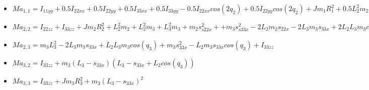\begin{itemize}
	\item 
	$Ma_{1,1}= I_{11yy}+0.5I_{22xx}+0.5I_{22yy}+0.5I_{33xx} +0.5I_{33yy} - 			0.5I_{22xx}cos(2q_{2})+ 0.5I_{22yy}cos(2q_2)+Jm_1R_{1}^{2} + 0.5L_{2}^{2}m_{2} +0.5L_{2}^{2}m_{3}+ 0.5L_{3}^{2}m_{3}- 0.5I_{33xx}cos(2q_{2} + 2q_{3}) +0.5I_{33yy}cos(2q_{2} + 2q_{3}) + m_{1}s{11z}^{2} + 0.5m_{2}s_{22x}^{2}+ 0.5m_{3}s_{33x}^{2}+ 0.5m_{2}s_{22x}^{2}cos(2q_{2})+ 0.5L_{3}^{2}m_{3}cos(2q_{2} + 2q_{3})+ 0.5m_{3}s{33x}^{2}cos(2q_{2}+2q_{3}) - 1.0L_{2}m_{2}s_{22x}- 1.0L_{3}m_{3}s_{33x} + 0.5L_{2}^{2}m_{2}cos(2q_{2}+ 0.5L_{2}^{2}m_{3}cos(2q_{2}+L_{2}L_{3}m_{3}cos(q_{3}) -1.0L_{2}m_{3}s_{33x}cos(q_{3})- 1.0L_{3}m_{3}s_{33x}cos(2q_{2} + 2q_{3})+L_{2}L_{3}m_{3}cos(2q_{2} + q_{3})-1.0L_{2}m_{3}s_{33x}cos(2q_{2} + q_{3})-1.0L_{2}m_{2}s_{22x}cos(2q_{2}).$ \\ 
	\vspace{0.2cm}	

	\item $Ma_{2,2}=I_{22zz}+I_{33zz}+Jm_{2}R_{2}^{2}+L_{2}^{2}m_{2}+L_{2}^{2}m_{3}+L_{3}^{2}m_{3}+m_{2}s_{s22x}^{2}++m_{3}s_{s33x}^{2}- 2L_{2}m_{2}s_{22x}- 2L_{3}m_{3}s_{33x}+ 2L_{2}L_{3}m_{3}cos(q_{3}-2L_{2}m_{3}s_{33x}cos(q_{3})$ \\
	 \vspace{0.2cm}
	
	\item 
	$Ma_{2,3}=m_{3}L_{3}^{2}- 2L_{3}m_{3}s_{33x}+L_{2}L_{3}m_{3}cos(q_{3})+m_{3}s_{33x}^{2}-L_{2}m_{3}s_{33x}cos(q_{3})+I_{33zz}$ \\ \vspace{0.2cm}
	
	\item 
	$Ma_{3,2}=I_{33zz}+m_{3}(L_{3}-s_{33x})(L_{3}-s_{33x}+L_{2}cos(q_{3}))$ \\ 
	\vspace{0.2cm}
	
	\item 
	$Ma_{3,3}=I_{33zz}+Jm_{3}R_{3}^{2}+m_{3}(L_{3}-s_{33x})^{2}$ \\ 
	\vspace{0.2cm}

	
\end{itemize}

